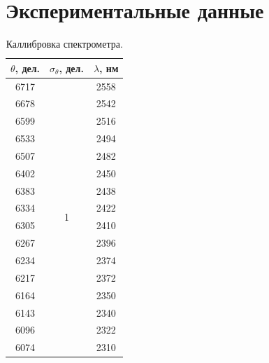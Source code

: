 \documentclass[a4paper,12pt]{article} %
\begin{document}
	\newpage
	\section{Экспериментальные данные}
	
		\begin{table}[H]
			\caption{Каллибровка спектрометра.}
			\label{table:exp}
			\begin{tabular}{|c|c|c|}
				\hline
				$\theta$, дел. & $\sigma_\theta$, дел. & $\lambda$, нм \\ \hline
				6717           & \multirow{28}{*}{1}   & 2558          \\ \cline{1-1} \cline{3-3} 
				6678           &                       & 2542          \\ \cline{1-1} \cline{3-3} 
				6599           &                       & 2516          \\ \cline{1-1} \cline{3-3} 
				6533           &                       & 2494          \\ \cline{1-1} \cline{3-3} 
				6507           &                       & 2482          \\ \cline{1-1} \cline{3-3} 
				6402           &                       & 2450          \\ \cline{1-1} \cline{3-3} 
				6383           &                       & 2438          \\ \cline{1-1} \cline{3-3} 
				6334           &                       & 2422          \\ \cline{1-1} \cline{3-3} 
				6305           &                       & 2410          \\ \cline{1-1} \cline{3-3} 
				6267           &                       & 2396          \\ \cline{1-1} \cline{3-3} 
				6234           &                       & 2374          \\ \cline{1-1} \cline{3-3} 
				6217           &                       & 2372          \\ \cline{1-1} \cline{3-3} 
				6164           &                       & 2350          \\ \cline{1-1} \cline{3-3} 
				6143           &                       & 2340          \\ \cline{1-1} \cline{3-3} 
				6096           &                       & 2322          \\ \cline{1-1} \cline{3-3} 
				6074           &                       & 2310          \\ \cline{1-1} \cline{3-3} 

\end{tabular}
\end{table}
\end{document}
